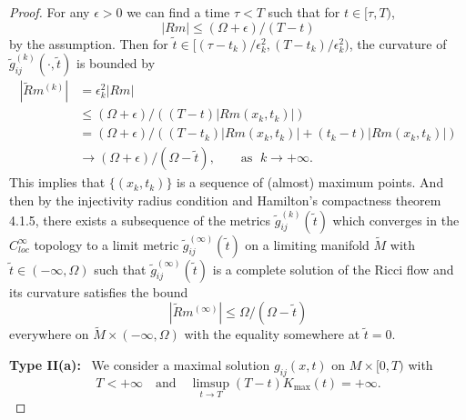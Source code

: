 \begin{proof}
For any $\epsilon>0$ we can find a time $\tau <T $ such that for
$t\in [\tau,T)$,
$$
|Rm|\leq (\Omega+\epsilon)/(T-t)
$$
by the assumption. Then for $\tilde{t}\in
[(\tau-t_k)/\epsilon_k^2,(T-t_k)/\epsilon_k^2)$, the curvature of
$\tilde{g}_{ij}^{(k)}(\cdot,\tilde{t})$ is bounded by
\begin{align*}
|\tilde{R}m^{(k)}|&  = \epsilon_k^2|Rm| \\
&  \leq(\Omega+\epsilon)/((T-t)|Rm(x_k,t_k)|) \\
& =(\Omega+\epsilon)/((T-t_k)|Rm(x_k,t_k)|+(t_k-t)|Rm(x_k,t_k)|)\\
&  \rightarrow (\Omega+\epsilon)/(\Omega-\tilde{t}), \qquad
\text{as } \; k\rightarrow +\infty.
\end{align*}
This implies that $\{(x_k,t_k)\}$ is a sequence of (almost)
maximum points. And then by the injectivity radius condition and
Hamilton's compactness theorem 4.1.5, there exists a subsequence
of the metrics $\tilde{g}_{ij}^{(k)}(\tilde {t})$ which converges
in the $C_{loc}^{\infty}$ topology to a limit metric
$\tilde{g}_{ij}^{(\infty)}(\tilde {t})$ on a limiting manifold
$\tilde{M}$ with $\tilde{t}\in(-\infty,\Omega)$ such that
$\tilde{g}_{ij}^{(\infty)}(\tilde {t})$ is a complete solution of
the Ricci flow and its curvature satisfies the bound
$$
|\tilde{R}m^{(\infty)}|\leq \Omega/(\Omega-\tilde{t})
$$
everywhere on $\tilde{M}\times (-\infty,\Omega)$ with the equality
somewhere at $\tilde{t}=0$.

\medskip
{\bf Type II(a):} \ We consider a maximal
solution $g_{ij}(x,t)$ on $M\times [0,T)$ with
$$
T<+\infty \quad\text{and} \quad \limsup_{t\rightarrow
T}(T-t)K_{\max}(t)=+\infty.
$$


\end{proof}

